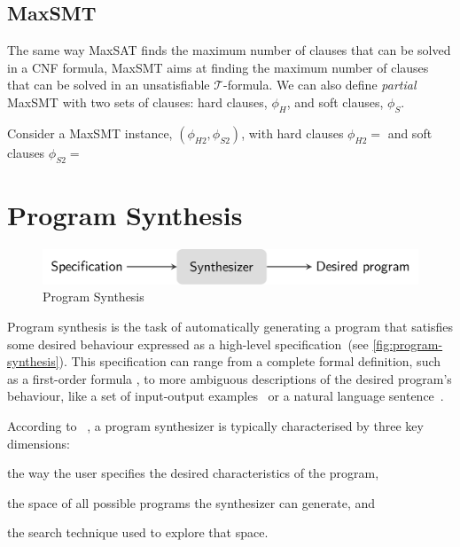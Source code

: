\subsection{\acl{MaxSMT}}

The same way \ac{MaxSAT} finds the maximum number of clauses that can be solved in a \ac{CNF} formula, \ac{MaxSMT} aims at finding the maximum number of clauses that can be solved in an unsatisfiable \(\mathcal{T}\)-formula.
We can also define \textit{partial} \ac{MaxSMT} with two sets of clauses: hard clauses, \(\phi_H\), and soft clauses, \(\phi_S\).

\begin{example}
Consider a \ac{MaxSMT} instance, \((\phi_{H2}, \phi_{S2})\), with hard clauses \(\phi_{H2} = \) and soft clauses \(\phi_{S2} = \)
\end{example}


\clearpage

\section{Program Synthesis} \label{sec:ps}
\begin{figure}
    \centering
    \includegraphics[scale=.35]{pictures/program_synthesis.pdf}
    \caption{Program Synthesis}
    \label{fig:program-synthesis}
\end{figure}
Program synthesis is the task of automatically generating a program that satisfies some desired behaviour expressed as a high-level specification~(see \autoref{fig:program-synthesis}).
This specification can range from a complete formal definition, such as a first-order formula \cite{DBLP:conf/ijcai/Green69,DBLP:conf/pldi/GulwaniJTV11}, to more ambiguous descriptions of the desired program's behaviour, like a set of input-output examples~\cite{DBLP:conf/iclr/BalogGBNT17,DBLP:conf/pldi/FengMBD18,DBLP:conf/icse/JhaGST10,DBLP:conf/ijcai/ShawWG75,DBLP:journals/jacm/Summers77} or a natural language sentence~\cite{DBLP:conf/icse/DesaiGHJKMRR16,DBLP:journals/pacmpl/Yaghmazadeh0DD17}.

According to \citeauthor{PSnow}~\cite{DBLP:conf/ppdp/Gulwani10,PSnow}, a program synthesizer is typically characterised by three key dimensions:
\begin{enumerate*}[label=(\roman*)]
  \item the way the user specifies the desired characteristics of the program,
  \item the space of all possible programs the synthesizer can generate, and
  \item the search technique used to explore that space.
\end{enumerate*}

